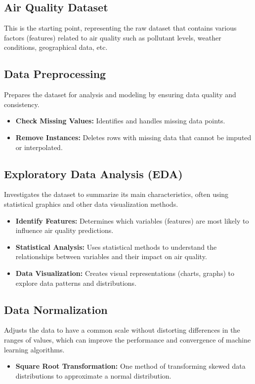 	\subsection{Air Quality Dataset}
	 This is the starting point, representing the raw dataset that contains various factors (features) related to air quality such as pollutant levels, weather conditions, geographical data, etc.
	
	\subsection{Data Preprocessing}
     Prepares the dataset for analysis and modeling by ensuring data quality and consistency.
	\begin{itemize}
		\item \textbf{Check Missing Values:} Identifies and handles missing data points.
		\item \textbf{Remove Instances:} Deletes rows with missing data that cannot be imputed or interpolated.
	\end{itemize}
	
	\subsection{Exploratory Data Analysis (EDA)}
	 Investigates the dataset to summarize its main characteristics, often using statistical graphics and other data visualization methods.
	\begin{itemize}
		\item \textbf{Identify Features:} Determines which variables (features) are most likely to influence air quality predictions.
		\item \textbf{Statistical Analysis:} Uses statistical methods to understand the relationships between variables and their impact on air quality.
		\item \textbf{Data Visualization:} Creates visual representations (charts, graphs) to explore data patterns and distributions.
	\end{itemize}
	
	\subsection{Data Normalization}
	Adjusts the data to have a common scale without distorting differences in the ranges of values, which can improve the performance and convergence of machine learning algorithms.
	\begin{itemize}
		\item \textbf{Square Root Transformation:} One method of transforming skewed data distributions to approximate a normal distribution.
	\end{itemize}
	

